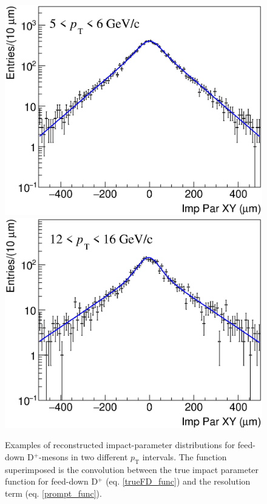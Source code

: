 \documentclass[b5paper,10pt,twoside,oldstyle,classica]{toptesi}
\newcommand{\pt}{p_\text{T}}
\begin{document}
\begin{figure}[tb]
\begin{center}
{\includegraphics[scale = 0.31]{ImpParRecoFD_5-6.eps}}
\hspace{-0.3cm}
{\includegraphics[scale = 0.31]{ImpParRecoFD_12-16.eps}}
\caption{Examples of reconstructed impact-parameter distributions for feed-down D$^+$-mesons in two different $\pt$ intervals. The function superimposed is the convolution between the true impact parameter function for feed-down D$^+$ (eq. \ref{trueFD_func}) and the resolution term (eq. \ref{prompt_func}).}
\label{recoFD_prefit}
\end{center}
\end{figure}
\end{document}
